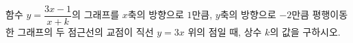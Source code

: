 \hspace*{2mm}\begin{minipage}[t]{\dimexpr\linewidth-2mm\relax}\vspace{0pt}
함수 $y=\dfrac{3x-1}{x+k}$의 그래프를 $x$축의 방향으로 $1$만큼, $y$축의 방향으로 $-2$만큼 평행이동한 그래프의 두 점근선의 교점이 직선 $y=3x$ 위의 점일 때, 상수 $k$의 값을 구하시오.\end{minipage}
